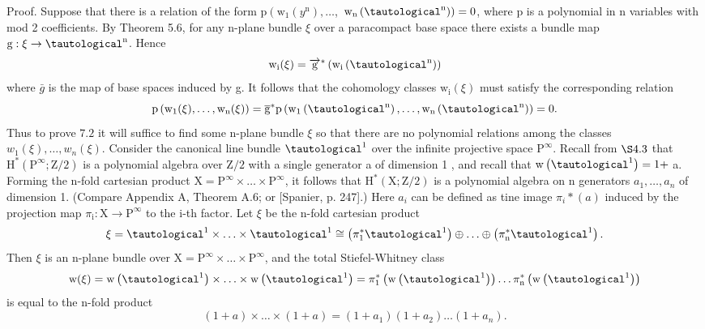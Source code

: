 \documentclass[10pt]{article}
\begin{document}
Proof. Suppose that there is a relation of the form $\mathrm{p}\left(\mathrm{w}_{1}\left(y^{\mathrm{n}}\right), \ldots\right.$, $\left.\mathrm{w}_{\mathrm{n}}\left(\tautological^{\mathrm{n}}\right)\right)=0$, where $\mathrm{p}$ is a polynomial in $\mathrm{n}$ variables with mod 2 coefficients. By Theorem 5.6, for any n-plane bundle $\xi$ over a paracompact base space there exists a bundle map $\mathrm{g}: \xi \rightarrow \tautological^{\mathrm{n}}$. Hence
$$
\mathrm{w}_{\mathrm{i}}(\xi)=\overrightarrow{\mathrm{g}}^{*}\left(\mathrm{w}_{\mathrm{i}}\left(\tautological^{\mathrm{n}}\right)\right)
$$
where $\bar{g}$ is the map of base spaces induced by g. It follows that the cohomology classes $\mathrm{w}_{\mathrm{i}}(\xi)$ must satisfy the corresponding relation
$$
\mathrm{p}\left(\mathrm{w}_{1}(\xi), \ldots, \mathrm{w}_{\mathrm{n}}(\xi)\right)=\overline{\mathrm{g}}^{*} \mathrm{p}\left(\mathrm{w}_{1}\left(\tautological^{\mathrm{n}}\right), \ldots, \mathrm{w}_{\mathrm{n}}\left(\tautological^{\mathrm{n}}\right)\right)=0 .
$$
Thus to prove $7.2$ it will suffice to find some n-plane bundle $\xi$ so that there are no polynomial relations among the classes $w_{1}(\xi), \ldots, w_{n}(\xi)$. Consider the canonical line bundle $\tautological^{1}$ over the infinite projective space $\mathrm{P}^{\infty}$. Recall from $\S 4.3$ that $\mathrm{H}^{*}\left(\mathrm{P}^{\infty} ; \mathrm{Z} / 2\right)$ is a polynomial algebra over $\mathrm{Z} / 2$ with a single generator a of dimension 1 , and recall that $\mathrm{w}\left(\tautological^{1}\right)=1+$ a. Forming the $\mathrm{n}$-fold cartesian product $\mathrm{X}=\mathrm{P}^{\infty} \times \ldots \times \mathrm{P}^{\infty}$, it follows that $\mathrm{H}^{*}(\mathrm{X} ; \mathrm{Z} / 2)$ is a polynomial algebra on $\mathrm{n}$ generators $a_{1}, \ldots, a_{n}$ of dimension 1. (Compare Appendix A, Theorem A.6; or [Spanier, p. 247].) Here $a_{i}$ can be defined as tine image $\pi_{i} *(a)$ induced by the projection map $\pi_{\mathrm{i}}: \mathrm{X} \rightarrow \mathrm{P}^{\infty}$ to the $\mathrm{i}$-th factor. Let $\xi$ be the $\mathrm{n}$-fold cartesian product
$$
\xi=\tautological^{1} \times \ldots \times \tautological^{1} \cong\left(\pi_{1}^{*} \tautological^{1}\right) \oplus \ldots \oplus\left(\pi_{\mathrm{n}}^{*} \tautological^{1}\right) .
$$
Then $\xi$ is an n-plane bundle over $\mathrm{X}=\mathrm{P}^{\infty} \times \ldots \times \mathrm{P}^{\infty}$, and the total Stiefel-Whitney class
$$
\mathrm{w}(\xi)=\mathrm{w}\left(\tautological^{1}\right) \times \ldots \times \mathrm{w}\left(\tautological^{1}\right)=\pi_{1}^{*}\left(\mathrm{w}\left(\tautological^{1}\right)\right) \ldots \pi_{\mathrm{n}}^{*}\left(\mathrm{w}\left(\tautological^{1}\right)\right)
$$
is equal to the $\mathrm{n}$-fold product
$$
(1+a) \times \ldots \times(1+a)=\left(1+a_{1}\right)\left(1+a_{2}\right) \ldots\left(1+a_{n}\right) .
$$
\end{document}
